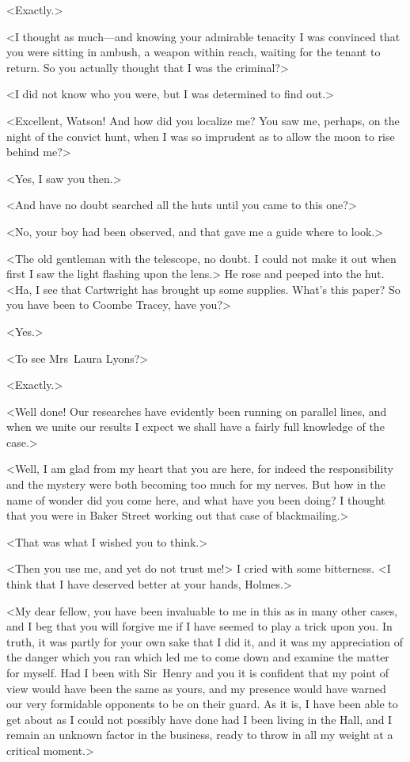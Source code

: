 <Exactly.>

<I thought as much—and knowing your admirable tenacity I was convinced that you were sitting in ambush, a weapon within reach, waiting for the tenant to return. So you actually thought that I was the criminal?>

<I did not know who you were, but I was determined to find out.>

<Excellent, Watson! And how did you localize me? You saw me, perhaps, on the night of the convict hunt, when I was so imprudent as to allow the moon to rise behind me?>

<Yes, I saw you then.>

<And have no doubt searched all the huts until you came to this one?>

<No, your boy had been observed, and that gave me a guide where to look.>

<The old gentleman with the telescope, no doubt. I could not make it out when first I saw the light flashing upon the lens.> He rose and peeped into the hut. <Ha, I see that Cartwright has brought up some supplies. What's this paper? So you have been to Coombe Tracey, have you?>

<Yes.>

<To see Mrs~Laura Lyons?>

<Exactly.>

<Well done! Our researches have evidently been running on parallel lines, and when we unite our results I expect we shall have a fairly full knowledge of the case.>

<Well, I am glad from my heart that you are here, for indeed the responsibility and the mystery were both becoming too much for my nerves. But how in the name of wonder did you come here, and what have you been doing? I thought that you were in Baker Street working out that case of blackmailing.>

<That was what I wished you to think.>

<Then you use me, and yet do not trust me!> I cried with some bitterness. <I think that I have deserved better at your hands, Holmes.>

<My dear fellow, you have been invaluable to me in this as in many other cases, and I beg that you will forgive me if I have seemed to play a trick upon you. In truth, it was partly for your own sake that I did it, and it was my appreciation of the danger which you ran which led me to come down and examine the matter for myself. Had I been with Sir~Henry and you it is confident that my point of view would have been the same as yours, and my presence would have warned our very formidable opponents to be on their guard. As it is, I have been able to get about as I could not possibly have done had I been living in the Hall, and I remain an unknown factor in the business, ready to throw in all my weight at a critical moment.>

